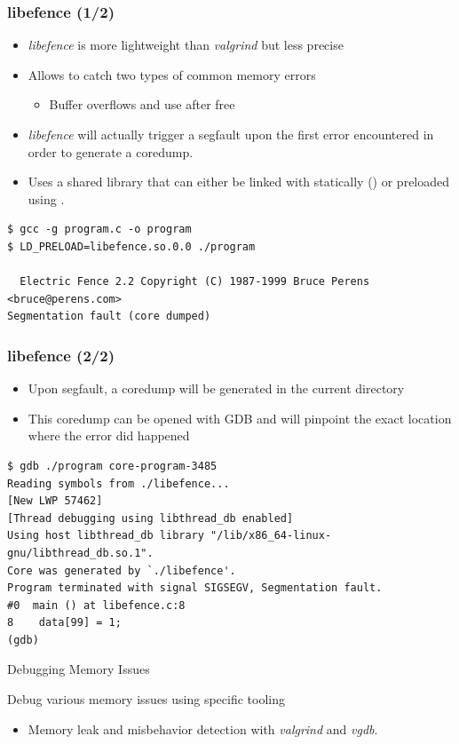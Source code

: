 \begin{frame}[fragile]
  \frametitle{libefence (1/2)}
  \begin{itemize}
    \item {\em libefence} is more lightweight than {\em valgrind} but less precise
    \item Allows to catch two types of common memory errors
    \begin{itemize}
      \item Buffer overflows and use after free
    \end{itemize}
    \item {\em libefence} will actually trigger a segfault upon the first error
          encountered in order to generate a coredump.
    \item Uses a shared library that can either be linked with statically
          () or preloaded using .
  \end{itemize}

  \begin{block}{}
    \begin{verbatim}
$ gcc -g program.c -o program
$ LD_PRELOAD=libefence.so.0.0 ./program

  Electric Fence 2.2 Copyright (C) 1987-1999 Bruce Perens <bruce@perens.com>
Segmentation fault (core dumped)
    \end{verbatim}
  \end{block}

\end{frame}

\begin{frame}[fragile]
  \frametitle{libefence (2/2)}
  \begin{itemize}
    \item Upon segfault, a coredump will be generated in the current directory
    \item This coredump can be opened with GDB and will pinpoint the exact
          location where the error did happened
  \end{itemize}
  \begin{block}{}
    \begin{verbatim}
$ gdb ./program core-program-3485
Reading symbols from ./libefence...
[New LWP 57462]
[Thread debugging using libthread_db enabled]
Using host libthread_db library "/lib/x86_64-linux-gnu/libthread_db.so.1".
Core was generated by `./libefence'.
Program terminated with signal SIGSEGV, Segmentation fault.
#0  main () at libefence.c:8
8    data[99] = 1;
(gdb) 
    \end{verbatim}
  \end{block}
\end{frame}

\setuplabframe
{Debugging Memory Issues}
{
  Debug various memory issues using specific tooling
  \begin{itemize}
    \item Memory leak and misbehavior detection with {\em valgrind} and
            {\em vgdb}.
  \end{itemize}
}